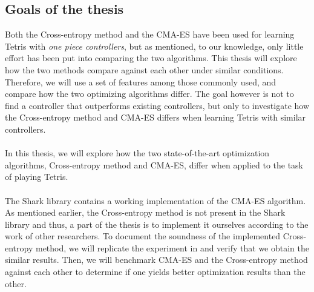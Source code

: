 \subsection{Goals of the thesis}

Both the Cross-entropy method and the CMA-ES have been used 
for learning Tetris with \textit{one piece controllers}, but as 
mentioned, to our knowledge, only little effort has been put into 
comparing the two algorithms. This thesis will explore
how the two methods compare against each other under similar
conditions. Therefore, we will use a set of features among those
commonly used, and compare how the two optimizing algorithms 
differ. The goal however is not to find a controller that 
outperforms existing controllers, but only to investigate 
how the Cross-entropy method and CMA-ES differs when learning Tetris
with similar controllers.\\
\\
In this thesis, we will explore how the two state-of-the-art
optimization algorithms, Cross-entropy method and CMA-ES, differ when 
applied to the task of playing Tetris.\\
\\
The Shark library \citep{shark08} contains a
working implementation of the CMA-ES 
algorithm. As mentioned earlier, the Cross-entropy method 
is not present in the Shark library and thus, 
a part of the thesis is to implement it ourselves according to 
the work of other researchers. To document the 
soundness of the implemented Cross-entropy method, 
we will replicate the experiment in \citep{thiery:09} and 
verify that we obtain the similar results.
Then, we will benchmark CMA-ES and the Cross-entropy method against each other 
to determine if one yields better optimization results than the other.
